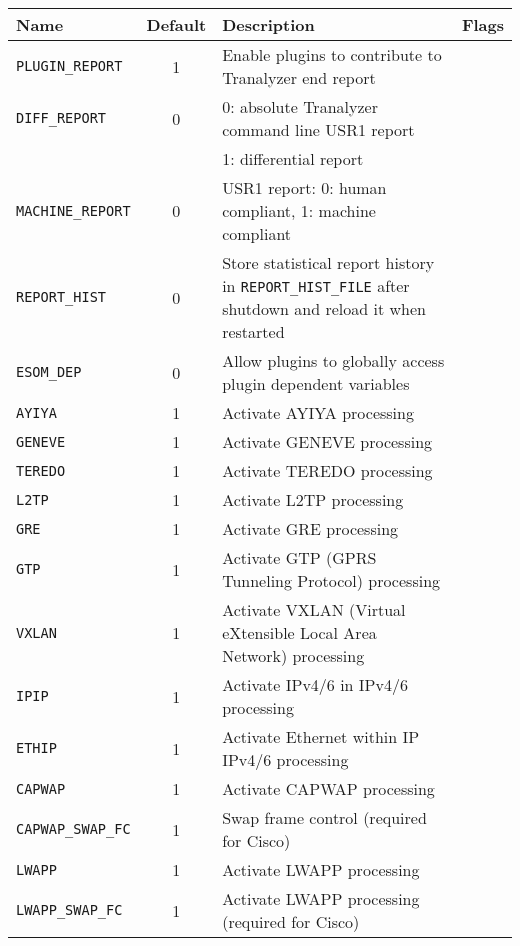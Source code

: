 \begin{center}
    \begin{tabularx}{\textwidth}{lcXl}
        \toprule
        {\bf Name} & {\bf Default} & {\bf Description} & {\bf Flags}\\
        \midrule
        {\tt PLUGIN\_REPORT}    & 1   & Enable plugins to contribute to Tranalyzer end report\\
        {\tt DIFF\_REPORT}      & 0   & 0: absolute Tranalyzer command line USR1 report\\
                                &     & 1: differential report\\
        {\tt MACHINE\_REPORT}   & 0   & USR1 report: 0: human compliant, 1: machine compliant\\
        {\tt REPORT\_HIST}      & 0   & Store statistical report history in {\tt REPORT\_HIST\_FILE} after
                                        shutdown and reload it when restarted\\
        {\tt ESOM\_DEP}         & 0   & Allow plugins to globally access plugin dependent variables\\
        {\tt AYIYA}             & 1   & Activate AYIYA processing\\
        {\tt GENEVE}            & 1   & Activate GENEVE processing\\
        {\tt TEREDO}            & 1   & Activate TEREDO processing\\
        {\tt L2TP}              & 1   & Activate L2TP processing\\
        {\tt GRE}               & 1   & Activate GRE processing\\
        {\tt GTP}               & 1   & Activate GTP (GPRS Tunneling Protocol) processing\\
        {\tt VXLAN}             & 1   & Activate VXLAN (Virtual eXtensible Local Area Network) processing\\
        {\tt IPIP}              & 1   & Activate IPv4/6 in IPv4/6 processing\\
        {\tt ETHIP}             & 1   & Activate Ethernet within IP IPv4/6 processing\\
        {\tt CAPWAP}            & 1   & Activate CAPWAP processing\\
        {\tt CAPWAP\_SWAP\_FC}  & 1   & Swap frame control (required for Cisco)\\
        {\tt LWAPP}             & 1   & Activate LWAPP processing\\
        {\tt LWAPP\_SWAP\_FC}   & 1   & Activate LWAPP processing (required for Cisco)\\

\end{tabularx}
\end{center}
